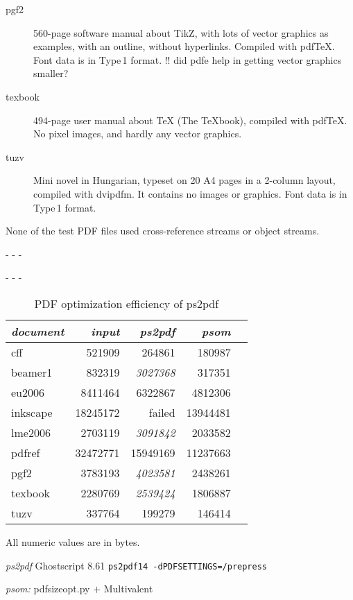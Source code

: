 \documentclass{ltugproc}
\def\cmd{\textsf}
\def\captiontop#1{%
  \advance\abovecaptionskip-\belowcaptionskip
  \advance\belowcaptionskip\abovecaptionskip
  \advance\abovecaptionskip-\belowcaptionskip
  \abovecaptionskip-\abovecaptionskip
  \caption{#1}%
  \advance\abovecaptionskip-\belowcaptionskip
  \advance\belowcaptionskip\abovecaptionskip
  \advance\abovecaptionskip-\belowcaptionskip
  \abovecaptionskip-\abovecaptionskip
}
\begin{document}
\begin{description}
\item[pgf2] 560-page software manual about TikZ, with lots of vector
graphics as examples, with an outline, without hyperlinks. Compiled with
pdf\TeX{}. Font data is in Type\,1 format.
!! did pdfe help in getting vector graphics smaller?

\item[texbook] 494-page user manual about \TeX{} (The \TeX{}book), compiled
with pdf\TeX{}. No pixel images, and hardly any vector graphics.

\item[tuzv] Mini novel in Hungarian, typeset on 20 A4 pages in a 2-column
layout, compiled with \cmd{dvipdfm}. It contains no images or graphics. Font data
is in Type\,1 format.

\end{description}

\noindent None of the test PDF files used cross-reference streams or object streams.


\begin{table}
\captiontop{PDF optimization efficiency
of \cmd{ps2pdf}}\label{tab:eff-ps2pdf}
\par\small\noindent\hfil
\begin{tabular}{@{}lrrrr@{}}
\toprule
\emph{document} & \emph{input} & \emph{ps2pdf} & \emph{psom} \\\midrule
cff         &   521909 &   264861 &   180987 \\
beamer1     &   832319 &  \emph{3027368} &   317351 \\
eu2006      &  8411464 &  6322867 &  4812306 \\
inkscape    & 18245172 &  failed  & 13944481 \\
lme2006     &  2703119 &  \emph{3091842} &  2033582 \\
pdfref      & 32472771 & 15949169 & 11237663 \\
pgf2        &  3783193 &  \emph{4023581} &  2438261 \\
texbook     &  2280769 &  \emph{2539424} &  1806887 \\
tuzv        &   337764 &   199279 &   146414 \\
\bottomrule
\end{tabular}
\par\bigskip
\par\noindent All numeric values are in bytes.
\par\noindent\emph{ps2pdf} Ghostscript 8.61 \texttt{ps2pdf14 -dPDFSETTINGS=/prepress}
\par\noindent\emph{psom:} \cmd{pdfsizeopt.py} $+$ Multivalent
\end{table}
\end{document}
